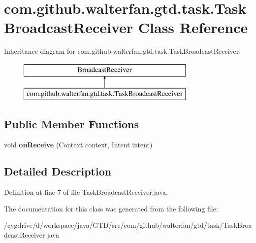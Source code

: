 \hypertarget{classcom_1_1github_1_1walterfan_1_1gtd_1_1task_1_1TaskBroadcastReceiver}{\section{com.\-github.\-walterfan.\-gtd.\-task.\-Task\-Broadcast\-Receiver Class Reference}
\label{classcom_1_1github_1_1walterfan_1_1gtd_1_1task_1_1TaskBroadcastReceiver}
}
Inheritance diagram for com.\-github.\-walterfan.\-gtd.\-task.\-Task\-Broadcast\-Receiver\-:\begin{figure}[H]
\begin{center}
\leavevmode
\includegraphics[height=2.000000cm]{classcom_1_1github_1_1walterfan_1_1gtd_1_1task_1_1TaskBroadcastReceiver}
\end{center}
\end{figure}
\subsection*{Public Member Functions}
\begin{DoxyCompactItemize}
\item 
\hypertarget{classcom_1_1github_1_1walterfan_1_1gtd_1_1task_1_1TaskBroadcastReceiver_a7e469a92165568aefe730aba4cab7bd4}{void {\bfseries on\-Receive} (Context context, Intent intent)}\label{classcom_1_1github_1_1walterfan_1_1gtd_1_1task_1_1TaskBroadcastReceiver_a7e469a92165568aefe730aba4cab7bd4}

\end{DoxyCompactItemize}


\subsection{Detailed Description}


Definition at line 7 of file Task\-Broadcast\-Receiver.\-java.



The documentation for this class was generated from the following file\-:\begin{DoxyCompactItemize}
\item 
/cygdrive/d/workspace/java/\-G\-T\-D/src/com/github/walterfan/gtd/task/Task\-Broadcast\-Receiver.\-java\end{DoxyCompactItemize}
